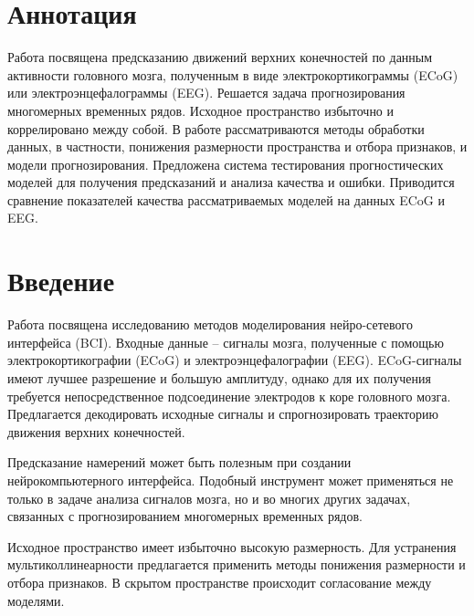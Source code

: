 \documentclass{article}
\begin{document}
\section{Аннотация}
	\iffalse
	    - чему посвящена работа в целом,
	    - на чем сконцентрировано исследование,
	    - в чем особенности исследования,
	    - что новое предлагается,
	    - какими примерами проиллюстрирована?
	\fi  
     Работа посвящена предсказанию движений верхних конечностей по данным активности головного мозга, полученным в виде электрокортикограммы (ECoG) или электроэнцефалограммы (EEG). Решается задача прогнозирования многомерных временных рядов.  Исходное пространство избыточно и коррелировано между собой. В работе рассматриваются методы обработки данных, в частности, понижения размерности пространства и отбора признаков, и модели прогнозирования. Предложена система тестирования прогностических моделей для получения предсказаний и анализа качества и ошибки. Приводится сравнение показателей качества рассматриваемых моделей на данных ECoG и EEG.
     
\section{Введение}
	\iffalse
	    - Основное сообщение — чему посвящена работа (одна-две фразы)
        - Обзор литературы — развитие предлагаемой идеи (не более двух абзацев)
        - Современное состояние области (два-четыре абзаца)
        - Что предлагается (два абзаца) 
	\fi
	
	Работа посвящена исследованию методов моделирования нейро-сетевого интерфейса (BCI).
	Входные данные -- сигналы мозга, полученные с помощью электрокортикографии (ECoG) и электроэнцефалографии (EEG). ECoG-сигналы имеют лучшее разрешение и большую амплитуду, однако для их получения требуется непосредственное подсоединение электродов к коре головного мозга. Предлагается декодировать исходные сигналы и спрогнозировать траекторию движения верхних конечностей.
    
    Предсказание намерений может быть полезным при создании нейрокомпьютерного интерфейса.  Подобный инструмент может применяться не только в задаче анализа сигналов мозга, но и во многих других задачах, связанных с прогнозированием многомерных временных рядов.
    
    Исходное пространство имеет избыточно высокую размерность. Для устранения мультиколлинеарности предлагается применить методы понижения размерности и отбора признаков. В скрытом пространстве происходит согласование между моделями.
    
\end{document}
